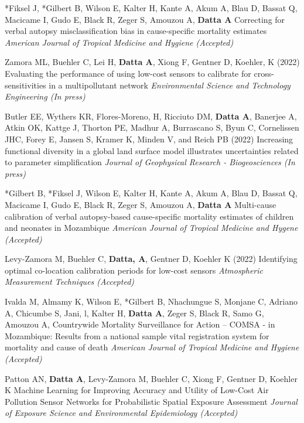 \documentclass[12pt]{article}
\newcommand{\mine}{
  \addtocounter{enumi}{1}
\item[\fcolorbox{white}{grey}{\color{white} \tiny \arabic{enumi}}]
}
\begin{document}
\mine *Fiksel J, *Gilbert B, Wilson E, Kalter H, Kante A, Akum A, Blau D, Bassat Q, Macicame I, Gudo E, Black R, Zeger  S, Amouzou A, \textbf{Datta A}  {Correcting for verbal autopsy misclassification bias in cause-specific mortality estimates} {\it American Journal of Tropical Medicine and Hygiene (Accepted)}

\item Zamora ML, Buehler C, Lei H, \textbf{Datta A}, Xiong F, Gentner D, Koehler, K (2022) {Evaluating the performance of using low-cost sensors to calibrate for cross-sensitivities in a multipollutant network} {\it Environmental Science and Technology Engineering (In press)}

\item Butler EE, Wythers KR, Flores-Moreno, H, Ricciuto DM, \textbf{Datta A}, Banerjee A, Atkin OK, Kattge J, Thorton PE, Madhur A, Burrascano S, Byun C, Cornelissen JHC, Forey E, Jansen S, Kramer K, Minden V, and Reich PB (2022) {Increasing functional diversity in a global land surface model illustrates uncertainties related to parameter simplification} {\it Journal of Geophysical Research - Biogeosciences (In press)}

\mine *Gilbert B, *Fiksel J, Wilson E, Kalter H, Kante A, Akum A, Blau D, Bassat Q, Macicame I, Gudo E, Black R, Zeger  S, Amouzou A, \textbf{Datta A} {Multi-cause calibration of verbal autopsy-based cause-specific mortality estimates of children and neonates in Mozambique} {\it American Journal of Tropical Medicine and Hygene (Accepted)}

\item Levy-Zamora M, Buehler C, \textbf{Datta, A}, Gentner D, Koehler K (2022) {Identifying optimal co-location calibration periods for low-cost sensors} {\it Atmospheric Measurement Techniques (Accepted)}

\item Ivalda M, Almamy K, Wilson E, *Gilbert B, Nhachungue S, Monjane C, Adriano A, Chicumbe S, Jani, l, Kalter H, \textbf{Datta A}, Zeger S, Black R, Samo G, Amouzou A, {Countrywide Mortality Surveillance for Action – COMSA - in Mozambique: Results from a national sample vital registration system for mortality and cause of death} {\it American Journal of Tropical Medicine and Hygiene (Accepted)}

\item Patton AN, \textbf{Datta A}, Levy-Zamora M, Buehler C, Xiong F, Gentner D, Koehler K {Machine Learning for Improving Accuracy and Utility of Low-Cost Air Pollution Sensor Networks for Probabilistic Spatial Exposure Assessment} {\it Journal of Exposure Science and Environmental Epidemiology (Accepted)}
\end{document}

